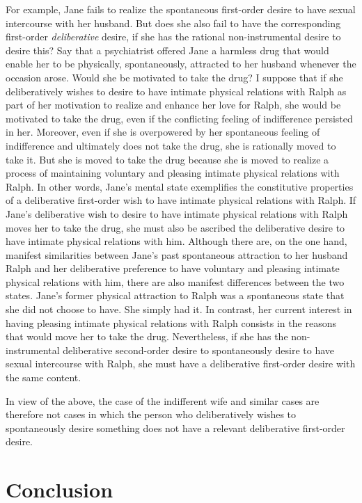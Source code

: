 \documentclass[output=paper]{langscibook}
\begin{document}
For example, Jane fails to realize the spontaneous first-order desire to have sexual intercourse with her husband. But does she also fail to have the corresponding first-order \textit{deliberative} desire, if she has the rational non-instrumental desire to desire this? Say that a psychiatrist offered Jane a harmless drug that would enable her to be physically, spontaneously, attracted to her husband whenever the occasion arose. Would she be motivated to take the drug? I suppose that if she deliberatively wishes to desire to have intimate physical relations with Ralph as part of her motivation to realize and enhance her love for Ralph, she would be motivated to take the drug, even if the conflicting feeling of indifference persisted in her. Moreover, even if she is overpowered by her spontaneous feeling of indifference and ultimately does not take the drug, she is rationally moved to take it. But she is moved to take the drug because she is moved to realize a process of maintaining voluntary and pleasing intimate physical relations with Ralph. In other words, Jane's mental state exemplifies the constitutive properties of a deliberative first-order wish to have intimate physical relations with Ralph. If Jane's deliberative wish to desire to have intimate physical relations with Ralph moves her to take the drug, she must also be ascribed the deliberative desire to have intimate physical relations with him. 
Although there are, on the one hand, manifest similarities between Jane's past spontaneous attraction to her husband Ralph and her deliberative preference to have voluntary and pleasing intimate physical relations with him, there are also manifest differences between the two states. Jane's former physical attraction to Ralph was a spontaneous state that she did not choose to have. She simply had it. In contrast, her current interest in having pleasing intimate physical relations with Ralph consists in the reasons that would move her to take the drug. Nevertheless, if she has the non-instrumental deliberative second-order desire to spontaneously desire to have sexual intercourse with Ralph, she must have a deliberative first-order desire with the same content. 

In view of the above, the case of the indifferent wife and similar cases are therefore not cases in which the person who deliberatively wishes to spontaneously desire something does not have a relevant deliberative first-order desire. 

\section{Conclusion}
\end{document}
